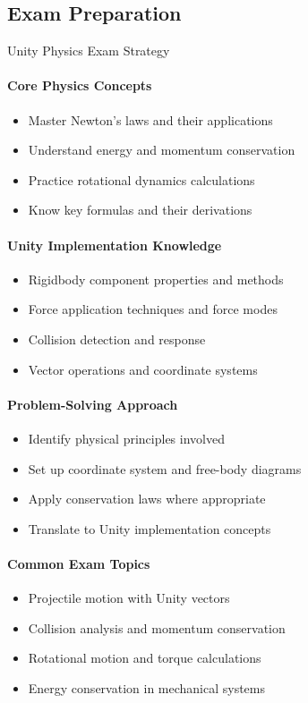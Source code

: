 \subsection{Exam Preparation}

\begin{KR}{Unity Physics Exam Strategy}\\
    \paragraph{Core Physics Concepts}
    \begin{itemize}
        \item Master Newton's laws and their applications
        \item Understand energy and momentum conservation
        \item Practice rotational dynamics calculations
        \item Know key formulas and their derivations
    \end{itemize}
    
    \paragraph{Unity Implementation Knowledge}
    \begin{itemize}
        \item Rigidbody component properties and methods
        \item Force application techniques and force modes
        \item Collision detection and response
        \item Vector operations and coordinate systems
    \end{itemize}
    
    \paragraph{Problem-Solving Approach}
    \begin{itemize}
        \item Identify physical principles involved
        \item Set up coordinate system and free-body diagrams
        \item Apply conservation laws where appropriate
        \item Translate to Unity implementation concepts
    \end{itemize}
    
    \paragraph{Common Exam Topics}
    \begin{itemize}
        \item Projectile motion with Unity vectors
        \item Collision analysis and momentum conservation
        \item Rotational motion and torque calculations
        \item Energy conservation in mechanical systems
    \end{itemize}
\end{KR}

